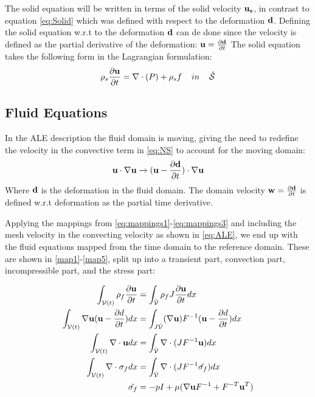 The solid equation will be written in terms of the solid velocity $\bold{u_s}$, in contrast to equation \eqref{eq:Solid} which was defined with respect to the deformation $\bold{d}$. Defining the solid equation w.r.t to the deformation $\bold{d}$ can de done since the velocity is defined as the partial derivative of the deformation: $\bold{u} = \frac{\partial \bold{d}}{\partial t}$
The solid equation takes the following form in the Lagrangian formulation:
\begin{equation} \label{eq:solid}
\rho_s \frac{\partial \bold{u}}{\partial t} = \nabla \cdot (P) + \rho_s f \hspace{4mm}in\hspace{4mm} \hat{\mathcal{S}} 
\end{equation}

\subsection{Fluid Equations}
In the ALE description the fluid domain is moving, giving the need to redefine the velocity in the convective term in \eqref{eq:NS} to account for the moving domain: 
\begin{equation}
\bold{u} \cdot \nabla \bold{u} \rightarrow (\bold{u}-\frac{\partial \bold{d}}{\partial t}) \cdot \nabla \bold{u}  
\end{equation}
Where $\bold{d}$ is the deformation in the fluid domain. The domain velocity $\bold{w} = \frac{\partial \bold{d}}{\partial t}$ is defined w.r.t deformation as the partial time derivative.

Applying the mappings from \eqref{eq:mappings1}-\eqref{eq:mappings3} and including the mesh velocity in the convecting velocity as shown in \eqref{eq:ALE}, we end up with the fluid equations mapped from the time domain to the reference domain. These are shown in \ref{map1}-\ref{map5}, split up into a transient part, convection part, incompressible part, and the stress part:

\begin{align}
\int_{\mathcal{V}(t)} \rho_f \frac{\partial \bold{u}}{\partial t}  & = \int_{\hat{\mathcal{V}}}  \rho_f J \frac{\partial \bold{u}}{\partial t} dx \label{map1} \\
\int_{\mathcal{V}(t)} \nabla \bold{u} (\bold{u}-\frac{\partial d}{\partial t}) dx  &= \int_{J \hat{\mathcal{V}}} (\nabla \bold{u})F^{-1}(\bold{u}-\frac{\partial d}{\partial t}) dx  \label{map2}\\
\int_{\mathcal{V}(t)} \nabla \cdot \bold{u} dx  &=\int_{\hat{\mathcal{V}}}  \nabla \cdot (J F^{-1} \bold{u}  ) dx \label{map3} \\
\int_{\mathcal{V}(t)} \nabla \cdot \sigma_f dx &= \int_{\hat{\mathcal{V}}} \nabla \cdot( J F^{-1} \hat{\sigma_f} )     dx \label{map4} \\
\hat{\sigma_f} &= -pI + \mu ( \nabla \bold{u} F^{-1} + F^{-T} \bold{u}^{T}  ) \label{map5}
\end{align}

